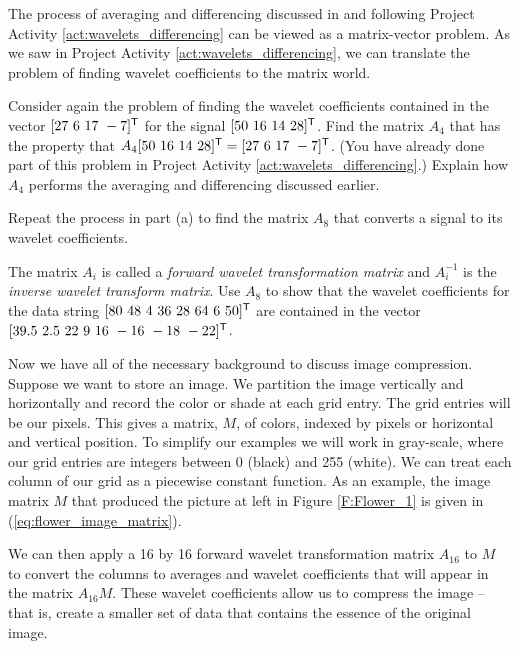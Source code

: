 \begin{pactivity} \label{act:wavelets_matrices} The process of averaging and differencing discussed in and following Project Activity \ref{act:wavelets_differencing} can be viewed as a matrix-vector problem. As we saw in Project Activity \ref{act:wavelets_differencing}, we can translate the problem of finding wavelet coefficients to the matrix world. 
	\ba
	\item Consider again the problem of finding the wavelet coefficients contained in the vector $[27 \ 6 \ 17 \ - 7]^{\mathsf{T}}$ for the signal $[50 \ 16 \ 14 \ 28]^{\mathsf{T}}$. Find the matrix $A_4$ that has the property that $A_4 [50 \ 16 \ 14 \ 28]^{\mathsf{T}} = [27 \ 6 \ 17 \ - 7]^{\mathsf{T}}$. (You have already done part of this problem in Project Activity \ref{act:wavelets_differencing}.) Explain how $A_4$ performs the averaging and differencing discussed earlier.


	\item Repeat the process in part (a) to find the matrix $A_8$ that converts a signal to its wavelet coefficients. 



\item The matrix $A_i$ is called a \emph{forward wavelet transformation matrix} and $A_i^{-1}$ is the \emph{inverse wavelet transform matrix}. Use $A_8$ to show that the wavelet coefficients for the data string $[80 \ 48 \ 4 \ 36 \ 28 \ 64 \ 6 \ 50]^{\mathsf{T}}$ are contained in the vector $[39.5 \ 2.5 \ 22 \ 9 \ 16 \ -16 \ -18 \ -22]^{\mathsf{T}}$. 

	\ea
	
\end{pactivity}

Now we have all of the necessary background to discuss image compression. Suppose we want to store an image. We partition the image vertically and horizontally and record the color or shade at each grid entry. The grid entries will be our pixels. This gives a matrix, $M$, of colors, indexed by pixels or horizontal and vertical position. To simplify our examples we will work in gray-scale, where our grid entries are integers between 0 (black) and 255 (white). We can treat each column of our grid as a piecewise constant function. As an example, the image matrix $M$ that produced the picture at left in Figure \ref{F:Flower_1} is given in (\ref{eq:flower_image_matrix}). 

We can then apply a 16 by 16 forward wavelet transformation matrix $A_{16}$ to $M$ to convert the columns to averages and wavelet coefficients that will appear in the matrix $A_{16}M$. These wavelet coefficients allow us to compress the image -- that is, create a smaller set of data that contains the essence of the original image. 


